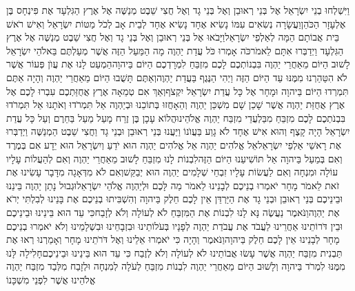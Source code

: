 \documentclass[../main/main.tex]{subfiles}
\begin{document}
\begin{multicols*}{\ncols}
וַיִּשְׁלְחוּ בְנֵי יִשְׂרָאֵל אֶל בְּנֵי רְאוּבֵן וְאֶל בְּנֵי גָד וְאֶל חֲצִי שֵׁבֶט מְנַשֶּׁה אֶל אֶרֶץ הַגִּלְעָד אֶת פִּינְחָס בֶּן אֶלְעָזָר הַכֹּהֵן\PreVerseSpace{}וַעֲשָׂרָה נְשִׂאִים עִמּוֹ נָשִׂיא אֶחָד נָשִׂיא אֶחָד לְבֵית אָב לְכֹל מַטּוֹת יִשְׂרָאֵל וְאִישׁ רֹאשׁ בֵּית אֲבוֹתָם הֵמָּה לְאַלְפֵי יִשְׂרָאֵל\PreVerseSpace{}וַיָּבֹאוּ אֶל בְּנֵי רְאוּבֵן וְאֶל בְּנֵי גָד וְאֶל חֲצִי שֵׁבֶט מְנַשֶּׁה אֶל אֶרֶץ הַגִּלְעָד וַיְדַבְּרוּ אִתָּם לֵאמֹר\PreVerseSpace{}כֹּה אָמְרוּ כֹּל עֲדַת יַהְוֶה מָה הַמַּעַל הַזֶּה אֲשֶׁר מְעַלְתֶּם בֵּאלֹהֵי יִשְׂרָאֵל לָשׁוּב הַיּוֹם מֵאַחֲרֵי יַהְוֶה בִּבְנוֹתְכֶם לָכֶם מִזְבֵּחַ לִמְרָדְכֶם הַיּוֹם בַּיהוָה\PreVerseSpace{}הַמְעַט לָנוּ אֶת עֲוֺן פְּעוֹר אֲשֶׁר לֹא הִטַּהַרְנוּ מִמֶּנּוּ עַד הַיּוֹם הַזֶּה וַיְהִי הַנֶּגֶף בַּעֲדַת יַהְוֶה\PreVerseSpace{}וְאַתֶּם תָּשֻׁבוּ הַיּוֹם מֵאַחֲרֵי יַהְוֶה וְהָיָה אַתֶּם תִּמְרְדוּ הַיּוֹם בַּיהוָה וּמָחָר אֶל כָּל עֲדַת יִשְׂרָאֵל יִקְצֹף\PreVerseSpace{}וְאַךְ אִם טְמֵאָה אֶרֶץ אֲחֻזַּתְכֶם עִבְרוּ לָכֶם אֶל אֶרֶץ אֲחֻזַּת יַהְוֶה אֲשֶׁר שָׁכַן שָׁם מִשְׁכַּן יַהְוֶה וְהֵאָחֲזוּ בְּתוֹכֵנוּ וּבְיַהְוֶה אַל תִּמְרֹדוּ וְאֹתָנוּ אַל תִּמְרֹדוּ בִּבְנֹתְכֶם לָכֶם מִזְבֵּחַ מִבַּלְעֲדֵי מִזְבַּח יַהְוֶה אֱלֹהֵינוּ\PreVerseSpace{}הֲלוֹא עָכָן בֶּן זֶרַח מָעַל מַעַל בַּחֵרֶם וְעַל כָּל עֲדַת יִשְׂרָאֵל הָיָה קָצֶף וְהוּא אִישׁ אֶחָד לֹא גָוַע בַּעֲוֺנוֹ \ClosedSection{}וַיַּעֲנוּ בְּנֵי רְאוּבֵן וּבְנֵי גָד וַחֲצִי שֵׁבֶט הַמְנַשֶּׁה וַיְדַבְּרוּ אֶת רָאשֵׁי אַלְפֵי יִשְׂרָאֵל\PreVerseSpace{}אֵל אֱלֹהִים יַהְוֶה אֵל אֱלֹהִים יַהְוֶה הוּא יֹדֵעַ וְיִשְׂרָאֵל הוּא יֵדָע אִם בְּמֶרֶד וְאִם בְּמַעַל בַּיהוָה אַל תּוֹשִׁיעֵנוּ הַיּוֹם הַזֶּה\PreVerseSpace{}לִבְנוֹת לָנוּ מִזְבֵּחַ לָשׁוּב מֵאַחֲרֵי יַהְוֶה וְאִם לְהַעֲלוֹת עָלָיו עוֹלָה וּמִנְחָה וְאִם לַעֲשׂוֹת עָלָיו זִבְחֵי שְׁלָמִים יַהְוֶה הוּא יְבַקֵּשׁ\PreVerseSpace{}וְאִם לֹא מִדְּאָגָה מִדָּבָר עָשִׂינוּ אֶת זֹאת לֵאמֹר מָחָר יֹאמְרוּ בְנֵיכֶם לְבָנֵינוּ לֵאמֹר מַה לָּכֶם וּלְיַהְוֶה אֱלֹהֵי יִשְׂרָאֵל\PreVerseSpace{}וּגְבוּל נָתַן יַהְוֶה בֵּינֵנוּ וּבֵינֵיכֶם בְּנֵי רְאוּבֵן וּבְנֵי גָד אֶת הַיַּרְדֵּן אֵין לָכֶם חֵלֶק בַּיהוָה וְהִשְׁבִּיתוּ בְנֵיכֶם אֶת בָּנֵינוּ לְבִלְתִּי יְרֹא אֶת יַהְוֶה\PreVerseSpace{}וַנֹּאמֶר נַעֲשֶׂה נָּא לָנוּ לִבְנוֹת אֶת הַמִּזְבֵּחַ לֹא לְעוֹלָה וְלֹא לְזָבַח\PreVerseSpace{}כִּי עֵד הוּא בֵּינֵינוּ וּבֵינֵיכֶם וּבֵין דֹּרוֹתֵינוּ אַחֲרֵינוּ לַעֲבֹד אֶת עֲבֹדַת יַהְוֶה לְפָנָיו בְּעֹלוֹתֵינוּ וּבִזְבָחֵינוּ וּבִשְׁלָמֵינוּ וְלֹא יֹאמְרוּ בְנֵיכֶם מָחָר לְבָנֵינוּ אֵין לָכֶם חֵלֶק בַּיהוָה\PreVerseSpace{}וַנֹּאמֶר וְהָיָה כִּי יֹאמְרוּ אֵלֵינוּ וְאֶל דֹּרֹתֵינוּ מָחָר וְאָמַרְנוּ רְאוּ אֶת תַּבְנִית מִזְבַּח יַהְוֶה אֲשֶׁר עָשׂוּ אֲבוֹתֵינוּ לֹא לְעוֹלָה וְלֹא לְזֶבַח כִּי עֵד הוּא בֵּינֵינוּ וּבֵינֵיכֶם\PreVerseSpace{}חָלִילָה לָּנוּ מִמֶּנּוּ לִמְרֹד בַּיהוָה וְלָשׁוּב הַיּוֹם מֵאַחֲרֵי יַהְוֶה לִבְנוֹת מִזְבֵּחַ לְעֹלָה לְמִנְחָה וּלְזָבַח מִלְּבַד מִזְבַּח יַהְוֶה אֱלֹהֵינוּ אֲשֶׁר לִפְנֵי מִשְׁכָּנוֹ\OpenSection{}\par

\end{multicols*}
\end{document}
